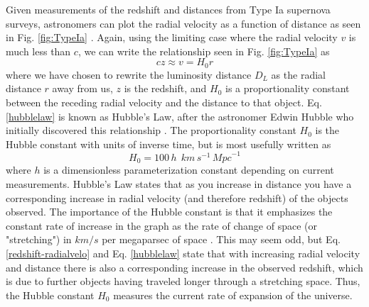 Given measurements of the redshift and distances from Type Ia supernova surveys, astronomers can plot the radial velocity as a function of distance as seen in Fig. \ref{fig:TypeIa} \cite{Kirshner2004:HubbleDiagram}. Again, using the limiting case where the radial velocity $v$ is much less than $c$, we can write the relationship seen in Fig. \ref{fig:TypeIa} as
%
\begin{equation}\label{hubblelaw}
cz \approx v = H_0 r
\end{equation}
%
where we have chosen to rewrite the luminosity distance $D_L$ as the radial distance $r$ away from us, $z$ is the redshift, and $H_0$ is a proportionality constant between the receding radial velocity and the distance to that object. Eq. \ref{hubblelaw} is known as Hubble's Law, after the astronomer Edwin Hubble who initially discovered this relationship \cite{Kirshner2004:HubbleDiagram}. The proportionality constant $H_0$ is the Hubble constant with units of inverse time, but is most usefully written as
%
\begin{equation}\label{hubbleconst}
H_0 = 100\,h\;\, km\, s^{-1}\, {Mpc} ^{-1}
\end{equation}
%
where $h$ is a dimensionless parameterization constant depending on current measurements. Hubble's Law states that as you increase in distance you have a corresponding increase in radial velocity (and therefore redshift) of the objects observed. The importance of the Hubble constant is that it emphasizes the constant rate of increase in the graph as the rate of change of space (or "stretching") in ${km}/{s}$ per megaparsec of space \cite{Hogg1999:DistanceMeas+GenRef}\cite{Kirshner2004:HubbleDiagram}. This may seem odd, but Eq. \ref{redshift-radialvelo} and Eq. \ref{hubblelaw} state that with increasing radial velocity and distance there is also a corresponding increase in the observed redshift, which is due to further objects having traveled longer through a stretching space. Thus, the Hubble constant $H_0$ measures the current rate of expansion of the universe.

